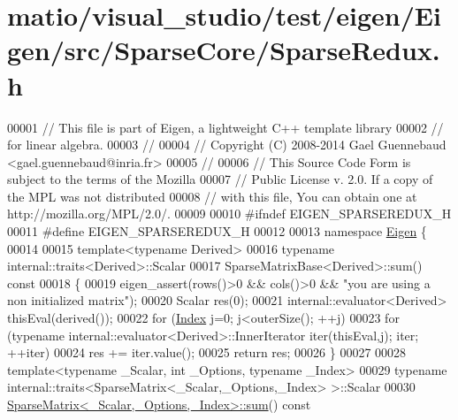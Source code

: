 \hypertarget{matio_2visual__studio_2test_2eigen_2_eigen_2src_2_sparse_core_2_sparse_redux_8h_source}{}\section{matio/visual\+\_\+studio/test/eigen/\+Eigen/src/\+Sparse\+Core/\+Sparse\+Redux.h}
\label{matio_2visual__studio_2test_2eigen_2_eigen_2src_2_sparse_core_2_sparse_redux_8h_source}

\begin{DoxyCode}
00001 \textcolor{comment}{// This file is part of Eigen, a lightweight C++ template library}
00002 \textcolor{comment}{// for linear algebra.}
00003 \textcolor{comment}{//}
00004 \textcolor{comment}{// Copyright (C) 2008-2014 Gael Guennebaud <gael.guennebaud@inria.fr>}
00005 \textcolor{comment}{//}
00006 \textcolor{comment}{// This Source Code Form is subject to the terms of the Mozilla}
00007 \textcolor{comment}{// Public License v. 2.0. If a copy of the MPL was not distributed}
00008 \textcolor{comment}{// with this file, You can obtain one at http://mozilla.org/MPL/2.0/.}
00009 
00010 \textcolor{preprocessor}{#ifndef EIGEN\_SPARSEREDUX\_H}
00011 \textcolor{preprocessor}{#define EIGEN\_SPARSEREDUX\_H}
00012 
00013 \textcolor{keyword}{namespace }\hyperlink{namespace_eigen}{Eigen} \{ 
00014 
00015 \textcolor{keyword}{template}<\textcolor{keyword}{typename} Derived>
00016 \textcolor{keyword}{typename} internal::traits<Derived>::Scalar
00017 SparseMatrixBase<Derived>::sum()\textcolor{keyword}{ const}
00018 \textcolor{keyword}{}\{
00019   eigen\_assert(rows()>0 && cols()>0 && \textcolor{stringliteral}{"you are using a non initialized matrix"});
00020   Scalar res(0);
00021   internal::evaluator<Derived> thisEval(derived());
00022   \textcolor{keywordflow}{for} (\hyperlink{namespace_eigen_a62e77e0933482dafde8fe197d9a2cfde}{Index} j=0; j<outerSize(); ++j)
00023     \textcolor{keywordflow}{for} (\textcolor{keyword}{typename} internal::evaluator<Derived>::InnerIterator iter(thisEval,j); iter; ++iter)
00024       res += iter.value();
00025   \textcolor{keywordflow}{return} res;
00026 \}
00027 
00028 \textcolor{keyword}{template}<\textcolor{keyword}{typename} \_Scalar, \textcolor{keywordtype}{int} \_Options, \textcolor{keyword}{typename} \_Index>
00029 \textcolor{keyword}{typename} internal::traits<SparseMatrix<\_Scalar,\_Options,\_Index> >::Scalar
00030 \hyperlink{group___sparse_core___module_a0700cd0b8658962d742fa51a5e594a2f}{SparseMatrix<\_Scalar,\_Options,\_Index>::sum}()\textcolor{keyword}{ const}

\end{DoxyCode}
